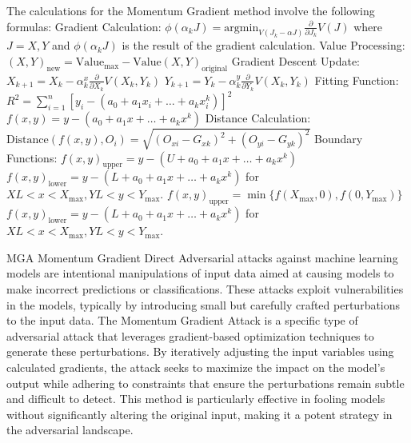The calculations for the Momentum Gradient method involve the following formulas:
Gradient Calculation:
$\phi(\alpha_k J) = \text{argmin}_{V(J_k - \alpha J)} \frac{\partial}{\partial J_k} V(J)$
where $J = X, Y$ and $\phi(\alpha_k J)$ is the result of the gradient calculation.
Value Processing:
$(X, Y)_{\text{new}} = \text{Value}_{\text{max}} - \text{Value}(X, Y)_{\text{original}}$
Gradient Descent Update:
$X_{k+1} = X_k - \alpha_k^x \frac{\partial}{\partial X_k} V(X_k, Y_k)$
$Y_{k+1} = Y_k - \alpha_k^y \frac{\partial}{\partial Y_k} V(X_k, Y_k)$
Fitting Function:
$R^2 = \sum_{i=1}^n [y_i - (a_0 + a_1x_i + \ldots + a_kx_i^k)]^2$
$f(x, y) = y - (a_0 + a_1x + \ldots + a_kx^k)$
Distance Calculation:
$\text{Distance}(f(x, y), O_i) = \sqrt{(O_{xi} - G_{xk})^2 + (O_{yi} - G_{yk})^2}$
Boundary Functions:
$f(x, y)_{\text{upper}} = y - (U + a_0 + a_1x + \ldots + a_kx^k)$
$f(x, y)_{\text{lower}} = y - (L + a_0 + a_1x + \ldots + a_kx^k)$
for $XL < x < X_{\text{max}}, YL < y < Y_{\text{max}}$.
$f(x, y)_{\text{upper}} = \min\{f(X_{\text{max}}, 0), f(0, Y_{\text{max}})\}$
$f(x, y)_{\text{lower}} = y - (L + a_0 + a_1x + \ldots + a_kx^k)$
for $XL < x < X_{\text{max}}, YL < y < Y_{\text{max}}$.

MGA Momentum Gradient Direct Adversarial attacks against machine learning models are intentional manipulations of input data aimed at causing models to make incorrect predictions or classifications. These attacks exploit vulnerabilities in the models, typically by introducing small but carefully crafted perturbations to the input data. The Momentum Gradient Attack is a specific type of adversarial attack that leverages gradient-based optimization techniques to generate these perturbations. By iteratively adjusting the input variables using calculated gradients, the attack seeks to maximize the impact on the model's output while adhering to constraints that ensure the perturbations remain subtle and difficult to detect. This method is particularly effective in fooling models without significantly altering the original input, making it a potent strategy in the adversarial landscape.

